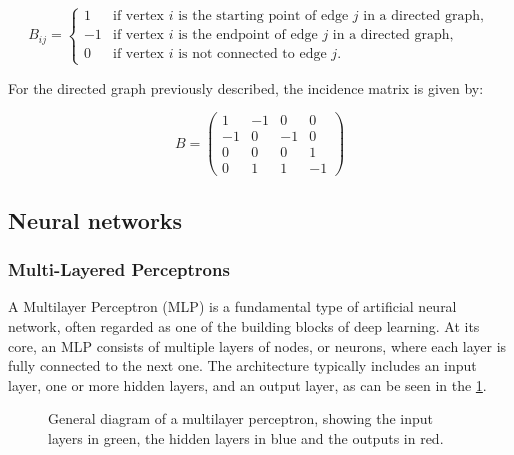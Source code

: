 \begin{equation}
 B_{ij} =
\begin{cases}
1 & \text{if vertex } i \text{ is the starting point of edge } j \text{ in a directed graph}, \\
-1 & \text{if vertex } i \text{ is the endpoint of edge } j \text{ in a directed graph}, \\
0 & \text{if vertex } i \text{ is not connected to edge } j.
\end{cases}  
    \label{eq:incidence_matrix_definition}
\end{equation}


For the directed graph previously described, the incidence matrix is given by:

\[
B = \begin{pmatrix}
1 & -1 & 0 & 0 \\
-1 & 0 & -1 & 0 \\
0 & 0 & 0 & 1  \\
0 & 1 & 1 & -1 
\end{pmatrix}
\]

\subsection{Neural networks}

\subsubsection{Multi-Layered Perceptrons}

A Multilayer Perceptron (MLP) is a fundamental type of artificial neural network, often regarded as one of the building blocks of deep learning. At its core, an MLP consists of multiple layers of nodes, or neurons, where each layer is fully connected to the next one. The architecture typically includes an input layer, one or more hidden layers, and an output layer, as can be seen in the \cref{fig:FCNN_representation}.


\begin{figure}
    \centering
    \setlength{}        
    \setlength{}
    \resizebox{\figurewidth}{\figureheight}{}
    \caption{General diagram of a multilayer perceptron, showing the input layers in green, the hidden layers in blue and the outputs in red.}\label{fig:FCNN_representation}
\end{figure}



